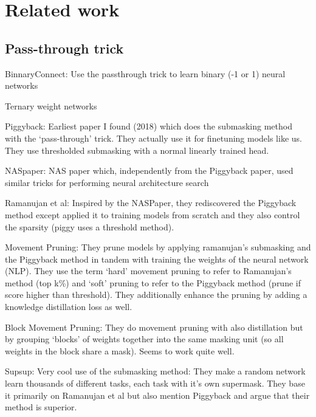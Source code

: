 \documentclass[12pt]{report}
\begin{document}
    \chapter{Related work}


    \section{Pass-through trick}
    BinnaryConnect: Use the passthrough trick to learn binary (-1 or 1) neural networks~\cite{courbariauxBinaryConnectTrainingDeep2016, hubaraBinarizedNeuralNetworks}

    Ternary weight networks ~\cite{liTernaryWeightNetworks2022, zhuTrainedTernaryQuantization2017}

    Piggyback: Earliest paper I found (2018) which does the submasking method with the ‘pass-through’ trick. They actually use it for finetuning models like us. They use thresholded submasking with a normal linearly trained head. ~\cite{mallyaPiggybackAdaptingSingle2018}

    NASpaper: NAS paper which, independently from the Piggyback paper, used similar tricks for performing neural architecture
    search~\cite{wortsmanDiscoveringNeuralWirings2019a}

    Ramanujan et al: Inspired by the NASPaper, they rediscovered the Piggyback method except applied it to training models from scratch and they also control the sparsity (piggy uses a threshold method).~\cite{ramanujanWhatHiddenRandomly2020}

    Movement Pruning: They prune models by applying ramanujan’s submasking and the Piggyback method in tandem with training the weights of the neural network (NLP). They use the term ‘hard’ movement pruning to refer to Ramanujan’s method (top k\%) and ‘soft’ pruning to refer to the Piggyback method (prune if score higher than threshold). They additionally enhance the pruning by adding a knowledge distillation loss as well.~\cite{sanhMovementPruningAdaptive}

    Block Movement Pruning: They do movement pruning with also distillation but by grouping ‘blocks’ of weights together into the same masking unit (so all weights in the block share a mask). Seems to work quite well.~\cite{lagunasBlockPruningFaster2021}

    Supsup: Very cool use of the submasking method: They make a random network learn thousands of different tasks, each task with it’s own supermask. They base it primarily on Ramanujan et al but also mention Piggyback and argue that their method is superior.~\cite{wortsmanSupermasksSuperposition}
\end{document}
